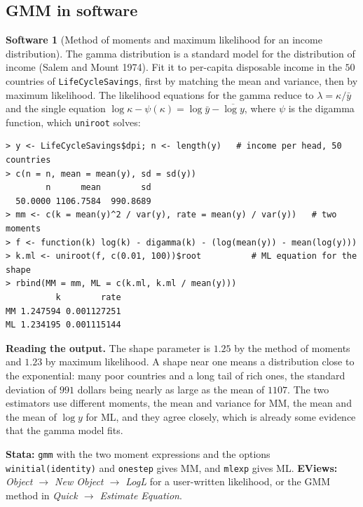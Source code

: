 \documentclass[11pt,a4paper]{article}
\numberwithin{equation}{section}
\theoremstyle{definition}
\newtheorem{software}[thm]{Software}
\begin{document}
\subsection{GMM in software}
\label{ssec:software15}

\begin{software}[Method of moments and maximum likelihood for an income distribution]
\label{sw:mmgamma}
The gamma distribution is a standard model for the distribution of income (Salem and Mount 1974). Fit it to per-capita disposable income in the $50$ countries
of \texttt{LifeCycleSavings}, first by matching the mean and variance, then by maximum likelihood. The likelihood equations for the gamma reduce to
$\lambda = \kappa/\bar y$ and the single equation $\log\kappa - \psi(\kappa) = \log\bar y - \overline{\log y}$, where $\psi$ is the digamma function, which \texttt{uniroot} solves:
{\small\begin{verbatim}
> y <- LifeCycleSavings$dpi; n <- length(y)   # income per head, 50 countries
> c(n = n, mean = mean(y), sd = sd(y))
        n      mean        sd 
  50.0000 1106.7584  990.8689 
> mm <- c(k = mean(y)^2 / var(y), rate = mean(y) / var(y))   # two moments
> f <- function(k) log(k) - digamma(k) - (log(mean(y)) - mean(log(y)))
> k.ml <- uniroot(f, c(0.01, 100))$root          # ML equation for the shape
> rbind(MM = mm, ML = c(k.ml, k.ml / mean(y)))
          k        rate
MM 1.247594 0.001127251
ML 1.234195 0.001115144
\end{verbatim}}
\textbf{Reading the output.} The shape parameter is $1.25$ by the method of moments and $1.23$ by maximum likelihood. A shape near one means a distribution close to
the exponential: many poor countries and a long tail of rich ones, the standard deviation of $991$ dollars being nearly as large as the mean of $1107$. The
two estimators use different moments, the mean and variance for MM, the mean and the mean of $\log y$ for ML, and they agree closely, which is already
some evidence that the gamma model fits.

\textbf{Stata:} \texttt{gmm} with the two moment expressions and the options \texttt{winitial(identity)} and \texttt{onestep} gives MM, and
\texttt{mlexp} gives ML. \textbf{EViews:} \emph{Object $\to$ New
Object $\to$ LogL} for a user-written likelihood, or the GMM method in \emph{Quick $\to$ Estimate Equation}.
\end{software}
\end{document}
